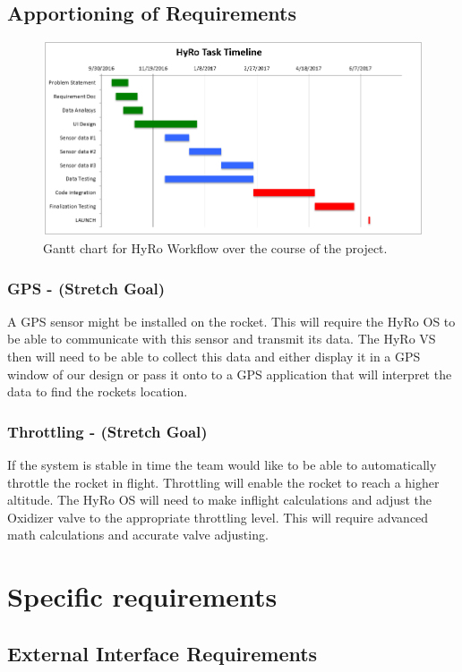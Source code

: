 \documentclass[10pt,draftclsnofoot,onecolumn,compsoc]{IEEEtran}
\begin{document}
\subsection{Apportioning of Requirements}
\begin{figure}
  \caption{Gantt chart for HyRo Workflow over the course of the project.}
  \centering
	\includegraphics[scale=.75]{GanntChart}
\end{figure}
\FloatBarrier
\subsubsection{\bf GPS - (Stretch Goal)} A GPS sensor might be installed on the rocket. This will require the HyRo OS to be able to communicate with this sensor and transmit its data. The HyRo VS then will need to be able to collect this data and either display it in a GPS window of our design or pass it onto to a GPS application that will interpret the data to find the rockets location.
\subsubsection{\bf Throttling - (Stretch Goal)} If the system is stable in time the team would like to be able to automatically throttle the rocket in flight. Throttling will enable the rocket to reach a higher altitude. The HyRo OS will need to make inflight calculations and adjust the Oxidizer valve to the appropriate throttling level. This will require advanced math calculations and accurate valve adjusting.

\section{ Specific requirements}
\subsection{External Interface Requirements}
\end{document}
